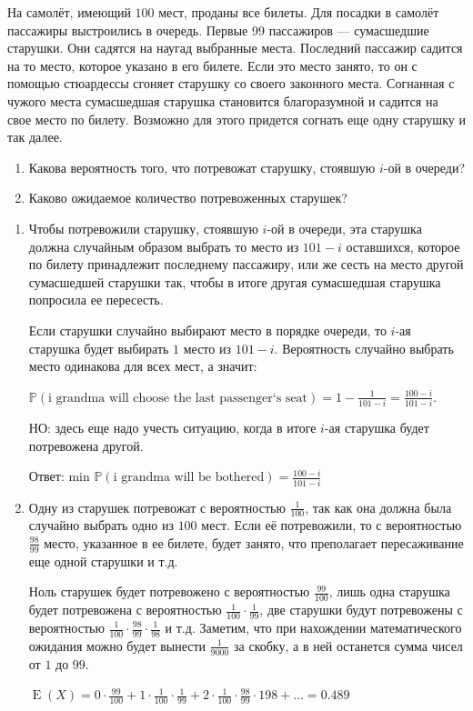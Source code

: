\documentclass[a4paper]{caesar_book}
\theoremstyle{definition}
\newcounter{problem}
\newenvironment{problem}%
{%
\refstepcounter{problem}%
     \hypertarget{problem:{\theproblem}}{}
     \Writetofile{solution_file}{\protect\hypertarget{soln:\theproblem}{}}
     \begin{myenum}[label=\bfseries\protect\hyperlink{soln:\theproblem}{\theproblem}, ref=\theproblem, leftmargin=0pt]
     \item%
    }%
    {%
    \end{myenum}}
\DeclareMathOperator{\E}{E}
\renewcommand{\P}{\mathbb{P}}
\begin{document}
\begin{problem}
На самолёт, имеющий $100$ мест, проданы все билеты.
Для посадки в самолёт пассажиры выстроились в очередь.
Первые 99 пассажиров — сумасшедшие старушки.
Они садятся на наугад выбранные места. Последний пассажир садится на то место,
которое указано в его билете. Если это место занято, то он с
помощью стюардессы сгоняет старушку со своего законного места.
Согнанная с чужого места сумасшедшая старушка становится
благоразумной и садится на свое место по билету. Возможно для
этого придется согнать еще одну старушку и так далее.
\begin{enumerate}
\item Какова вероятность того, что потревожат старушку, стоявшую $i$-ой в очереди?
\item Каково ожидаемое количество потревоженных старушек?
\end{enumerate}

\begin{sol}
\begin{enumerate}
\item Чтобы потревожили старушку, стоявшую $i$-ой в очереди,
эта старушка должна случайным образом выбрать то место из $101-i$ оставшихся,
которое по билету принадлежит последнему пассажиру,
или же сесть на место другой сумасшедшей старушки так,
чтобы в итоге другая сумасшедшая старушка попросила ее пересесть.

Если старушки случайно выбирают место в порядке очереди,
то $i$-ая старушка будет выбирать $1$ место из $101-i$.
Вероятность случайно выбрать место одинакова для всех мест, а значит:

$\P(\text{i grandma will choose the last passenger`s seat})=1 - \frac{1}{101-i} =
 \frac{100-i}{101-i}$.

НО: здесь еще надо учесть ситуацию,
когда в итоге $i$-ая старушка будет потревожена другой.

Ответ: min $\P(\text{i grandma will be bothered}) =\frac{100-i}{101-i}$

\item Одну из старушек потревожат с вероятностью $\frac{1}{100}$,
так как она должна была случайно выбрать одно из $100$ мест.
Если её потревожили, то с вероятностью $\frac{98}{99}$ место, указанное в ее билете,
будет занято, что преполагает пересаживание еще одной старушки и т.д.

Ноль старушек будет потревожено с вероятностью $\frac{99}{100}$,
лишь одна старушка будет потревожена с вероятностью $\frac{1}{100} \cdot \frac{1}{99}$,
две старушки будут потревожены с вероятностью
$\frac{1}{100} \cdot \frac{98}{99} \cdot \frac{1}{98}$ и т.д.
Заметим, что при нахождении математического ожидания
можно будет вынести $\frac{1}{9000}$ за скобку, а в ней останется
сумма чисел  от $1$ до $99$.

$\E(X) = 0 \cdot \frac{99}{100} + 1 \cdot \frac{1}{100} \cdot \frac{1}{99} +
2\cdot \frac{1}{100} \cdot \frac{98}{99} \cdot {1}{98} + \ldots  = 0.489$
\end{enumerate}
\end{sol}

\end{problem}
\end{document}
